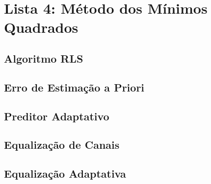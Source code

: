\section{Lista 4: Método dos Mínimos Quadrados}

\subsection{Algoritmo RLS}
\subsection{Erro de Estimação a Priori}
\subsection{Preditor Adaptativo}
\subsection{Equalização de Canais}
\subsection{Equalização Adaptativa}